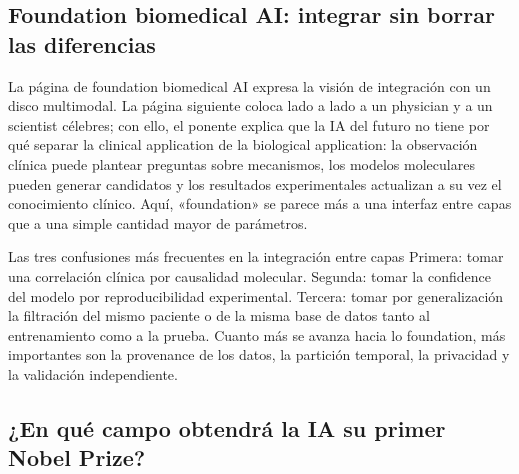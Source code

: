 \subsection{Foundation biomedical AI: integrar sin borrar las diferencias}

La página de foundation biomedical AI expresa la visión de integración con un disco multimodal. La página siguiente coloca lado a lado a un physician y a un scientist célebres; con ello, el ponente explica que la IA del futuro no tiene por qué separar la clinical application de la biological application: la observación clínica puede plantear preguntas sobre mecanismos, los modelos moleculares pueden generar candidatos y los resultados experimentales actualizan a su vez el conocimiento clínico. Aquí, «foundation» se parece más a una interfaz entre capas que a una simple cantidad mayor de parámetros.




\begin{warningbox}{Las tres confusiones más frecuentes en la integración entre capas}
Primera: tomar una correlación clínica por causalidad molecular. Segunda: tomar la confidence del modelo por reproducibilidad experimental. Tercera: tomar por generalización la filtración del mismo paciente o de la misma base de datos tanto al entrenamiento como a la prueba. Cuanto más se avanza hacia lo foundation, más importantes son la provenance de los datos, la partición temporal, la privacidad y la validación independiente.
\end{warningbox}

\subsection{¿En qué campo obtendrá la IA su primer Nobel Prize?}

